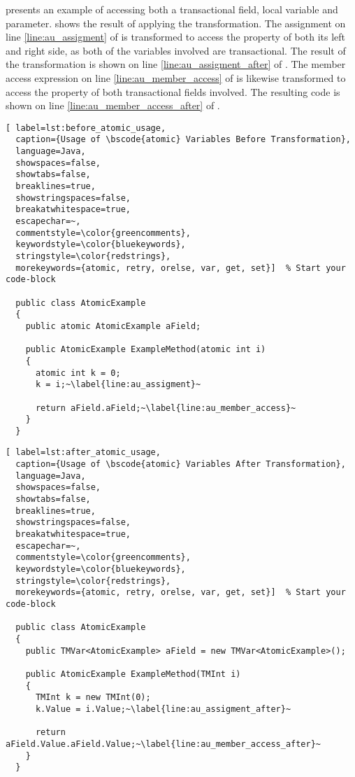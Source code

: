  presents an example of accessing both a transactional field, local variable and parameter.  shows the result of applying the transformation. The assignment on line \ref{line:au_assigment} of  is transformed to access the  property of both its left and right side, as both of the variables involved are transactional. The result of the transformation is shown on line \ref{line:au_assigment_after} of . The member access expression on line \ref{line:au_member_access} of  is likewise transformed to access the  property of both transactional fields involved. The resulting code is shown on line \ref{line:au_member_access_after} of .


\begin{lstlisting}[ label=lst:before_atomic_usage,
  caption={Usage of \bscode{atomic} Variables Before Transformation},
  language=Java,  
  showspaces=false,
  showtabs=false,
  breaklines=true,
  showstringspaces=false,
  breakatwhitespace=true,
  escapechar=~,
  commentstyle=\color{greencomments},
  keywordstyle=\color{bluekeywords},
  stringstyle=\color{redstrings},
  morekeywords={atomic, retry, orelse, var, get, set}]  % Start your code-block

  public class AtomicExample
  {
    public atomic AtomicExample aField;

    public AtomicExample ExampleMethod(atomic int i)
    {
      atomic int k = 0;
      k = i;~\label{line:au_assigment}~

      return aField.aField;~\label{line:au_member_access}~
    }
  }
\end{lstlisting}

\begin{lstlisting}[ label=lst:after_atomic_usage,
  caption={Usage of \bscode{atomic} Variables After Transformation},
  language=Java,  
  showspaces=false,
  showtabs=false,
  breaklines=true,
  showstringspaces=false,
  breakatwhitespace=true,
  escapechar=~,
  commentstyle=\color{greencomments},
  keywordstyle=\color{bluekeywords},
  stringstyle=\color{redstrings},
  morekeywords={atomic, retry, orelse, var, get, set}]  % Start your code-block

  public class AtomicExample
  {
    public TMVar<AtomicExample> aField = new TMVar<AtomicExample>();

    public AtomicExample ExampleMethod(TMInt i)
    {
      TMInt k = new TMInt(0);
      k.Value = i.Value;~\label{line:au_assigment_after}~

      return aField.Value.aField.Value;~\label{line:au_member_access_after}~
    }
  }
\end{lstlisting}


